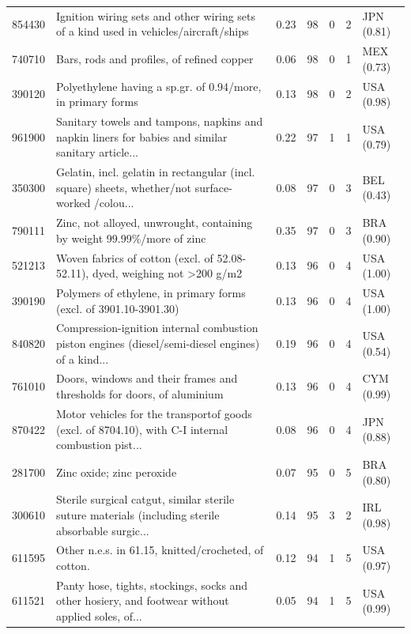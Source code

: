 \begin{tabular}{@{}l p{6.4cm} r r r r l@{}}
854430 & Ignition wiring sets and other wiring sets of a kind used in vehicles/\allowbreak{}aircraft/\allowbreak{}ships & 0.23 & 98 & 0 & 2 & JPN (0.81) \\
740710 & Bars, rods and profiles, of refined copper & 0.06 & 98 & 0 & 1 & MEX (0.73) \\
390120 & Polyethylene having a sp.gr. of 0.94/\allowbreak{}more, in primary forms & 0.13 & 98 & 0 & 2 & USA (0.98) \\
961900 & Sanitary towels and tampons, napkins and napkin liners for babies and similar sanitary article... & 0.22 & 97 & 1 & 1 & USA (0.79) \\
350300 & Gelatin, incl. gelatin in rectangular (incl. square) sheets, whether/\allowbreak{}not surface-worked /\allowbreak{}colou... & 0.08 & 97 & 0 & 3 & BEL (0.43) \\
790111 & Zinc, not alloyed, unwrought, containing by weight 99.99\%/\allowbreak{}more of zinc & 0.35 & 97 & 0 & 3 & BRA (0.90) \\
521213 & Woven fabrics of cotton (excl. of 52.08-52.11), dyed, weighing not >200 g/\allowbreak{}m2 & 0.13 & 96 & 0 & 4 & USA (1.00) \\
390190 & Polymers of ethylene, in primary forms (excl. of 3901.10-3901.30) & 0.13 & 96 & 0 & 4 & USA (1.00) \\
840820 & Compression-ignition internal combustion piston engines (diesel/\allowbreak{}semi-diesel engines) of a kind... & 0.19 & 96 & 0 & 4 & USA (0.54) \\
761010 & Doors, windows and their frames and thresholds for doors, of aluminium & 0.13 & 96 & 0 & 4 & CYM (0.99) \\
870422 & Motor vehicles for the transportof goods (excl. of 8704.10), with C-I internal combustion pist... & 0.08 & 96 & 0 & 4 & JPN (0.88) \\
281700 & Zinc oxide; zinc peroxide & 0.07 & 95 & 0 & 5 & BRA (0.80) \\
300610 & Sterile surgical catgut, similar sterile suture materials (including sterile absorbable surgic... & 0.14 & 95 & 3 & 2 & IRL (0.98) \\
611595 & Other n.e.s. in 61.15, knitted/\allowbreak{}crocheted, of cotton. & 0.12 & 94 & 1 & 5 & USA (0.97) \\
611521 & Panty hose, tights, stockings, socks and other hosiery, and footwear without applied soles, of... & 0.05 & 94 & 1 & 5 & USA (0.99) \\
\bottomrule
\end{tabular}
